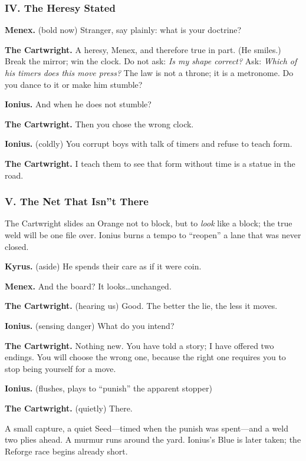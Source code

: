\documentclass[11pt]{article}
\begin{document}
\medskip
\subsubsection*{IV. The Heresy Stated}
\noindent\textbf{Menex.} (bold now) Stranger, say plainly: what is your doctrine?

\noindent\textbf{The Cartwright.} A heresy, Menex, and therefore true in part. (He smiles.) Break the mirror; win the clock. Do not ask: \emph{Is my shape correct?} Ask: \emph{Which of his timers  does this move press?} The law is not a throne; it is a metronome. Do you dance to it or make him stumble?

\noindent\textbf{Ionius.} And when he does not stumble?

\noindent\textbf{The Cartwright.} Then you chose the wrong clock.

\noindent\textbf{Ionius.} (coldly) You corrupt boys with talk of timers  and refuse to teach form.

\noindent\textbf{The Cartwright.} I teach them to see that form without time is a statue in the road.

\medskip
\subsubsection*{V. The Net That Isn''t There}
The Cartwright slides an Orange not to block, but to \emph{look} like a block; the true weld will be one file over. Ionius burns a tempo to ``reopen'' a lane that was never closed.

\noindent\textbf{Kyrus.} (aside) He spends their care as if it were coin.

\noindent\textbf{Menex.} And the board? It looks\dots unchanged.

\noindent\textbf{The Cartwright.} (hearing us) Good. The better the lie, the less it moves.

\noindent\textbf{Ionius.} (sensing danger) What do you intend?

\noindent\textbf{The Cartwright.} Nothing new. You have told a story; I have offered two endings. You will choose the wrong one, because the right one requires you to stop being yourself for a move.

\noindent\textbf{Ionius.} (flushes, plays to ``punish'' the apparent stopper)

\noindent\textbf{The Cartwright.} (quietly) There.

A small capture, a quiet Seed---timed when the punish was spent---and a weld two plies ahead. A murmur runs around the yard. Ionius's Blue is later taken; the Reforge race begins already short.
\end{document}
